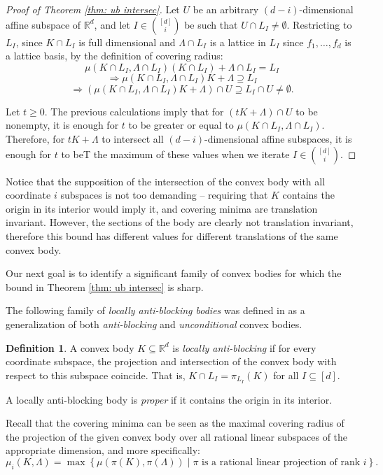 \documentclass{amsart}
\theoremstyle{definition}
\newtheorem{definition}[theorem]{Definition}
\theoremstyle{remark}
\newcommand{\R}{\mathbb{R}}
\begin{document}
\begin{proof}[Proof of Theorem \ref{thm: ub intersec}]
Let $U$ be an arbitrary $(d-i)$-dimensional affine subspace of $\R^d$, and let $I\in {[d]\choose i}$ be such that $U\cap L_I\neq \emptyset$. Restricting to $L_I$, since $K\cap L_I$ is full dimensional and $\Lambda\cap L_I$ is a lattice in $L_I$ since $f_1,\dots,f_d$ is a lattice basis, by the definition of covering radius:
$$\mu(K\cap L_I, \Lambda \cap L_I) (K\cap L_I) + \Lambda\cap L_I = L_I$$
$$\Rightarrow \mu(K\cap L_I, \Lambda \cap L_I)K+\Lambda \supseteq L_I$$
$$\Rightarrow (\mu(K\cap L_I, \Lambda \cap L_I)K+\Lambda) \cap U \supseteq L_I\cap U \neq \emptyset.$$

\noindent Let $t\geq 0$. The previous calculations imply that for $(tK+\Lambda)\cap U$ to be nonempty, it is enough for $t$ to be greater or equal to $\mu(K\cap L_I, \Lambda \cap L_I)$. Therefore, for $tK+\Lambda$ to intersect all $(d-i)$-dimensional affine subspaces, it is enough for $t$ to beT the maximum of these values when we iterate $I\in {[d] \choose i}$. 
\end{proof}

Notice that the supposition of the intersection of the convex body with all coordinate $i$ subspaces is not too demanding -- requiring that $K$ contains the origin in its interior would imply it, and covering minima are translation invariant. However, the sections of the body are clearly not translation invariant, therefore this bound has different values for different translations of the same convex body.

Our next goal is to identify a significant family of convex bodies for which the bound in Theorem \ref{thm: ub intersec} is sharp.

The following family of \textit{locally anti-blocking bodies} was defined in \cite{DefLAB} as a generalization of both \textit{anti-blocking} and \textit{unconditional} convex bodies.

\begin{definition}
A convex body $K\subseteq \R^d$ is \textit{locally anti-blocking} if for every coordinate subspace, the projection and intersection of the convex body with respect to this subspace coincide. That is, $
K\cap L_I=\pi_{L_I}(K)$ for all $I\subseteq [d]$.

\noindent A locally anti-blocking body is \textit{proper} if it contains the origin in its interior.
\end{definition}

Recall that the covering minima can be seen as the maximal covering radius of the projection of the given convex body over all rational linear subspaces of the appropriate dimension, and more specifically: 
 $$\mu_i(K, \Lambda)=\max\left\{ \mu(\pi(K), \pi(\Lambda ))\;| \; \pi \text{ is a rational linear projection of rank }i\right\}. $$
\end{document}

